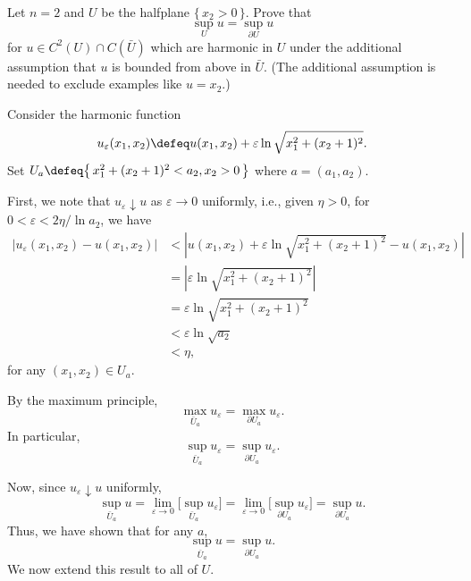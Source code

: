 \begin{problem}
  Let \(n=2\) and \(U\) be the halfplane \(\{\,x_2>0\,\}\). Prove that
  \[
    \sup_U u=\sup_{\partial U}u
  \]
  for \(u\in C^2(U)\cap C(\bar U)\) which are harmonic in \(U\) under the
  additional assumption that \(u\) is bounded from above in \(\bar
  U\). (The additional assumption is needed to exclude examples like
  \(u=x_2\).)

\end{problem}
\begin{solution}
  Consider the harmonic function
  \[
    u_\varepsilon(x_1,x_2)\defeq
    u(x_1,x_2)+\varepsilon\ln\sqrt{x_1^2+(x_2+1)^2}.
  \]
  Set \(U_a\defeq \bigl\{\,x_1^2+(x_2+1)^2<a_2,x_2>0\,\bigr\}\) where
  \(a=(a_1,a_2)\).

  First, we note that \(u_\varepsilon\downarrow u\) as \(\varepsilon\to 0\)
  uniformly, i.e., given \(\eta>0\), for \(0<\varepsilon<2\eta/{\ln a_2}\),
  we have
  \begin{align*}
    |u_\varepsilon(x_1,x_2)-u(x_1,x_2)|
    &<\left|
      u(x_1,x_2)+\varepsilon\ln\sqrt{x_1^2+(x_2+1)^2}
      -u(x_1,x_2)
      \right|\\
    &=\left|
      \varepsilon\ln\sqrt{x_1^2+(x_2+1)^2}
      \right|\\
    &=\varepsilon\ln\sqrt{x_1^2+(x_2+1)^2}\\
    &<\varepsilon\ln\sqrt{a_2}\\
    &<\eta,
  \end{align*}
  for any \((x_1,x_2)\in U_a\).

  By the maximum principle,
  \[
    \max_{\bar U_a}u_\varepsilon=\max_{\partial U_a}u_\varepsilon.
  \]
  In particular,
  \[
    \sup_{\bar U_a}u_\varepsilon=\sup_{\partial U_a}u_\varepsilon.
  \]

  Now, since \(u_\varepsilon\downarrow u\) uniformly,
  \[
    \sup_{\bar U_a}u=%
    \lim_{\varepsilon\to 0}\biggl[\sup_{\bar U_a}u_\varepsilon\biggr]=%
    \lim_{\varepsilon\to 0}\biggl[\sup_{\partial U_a}u_\varepsilon\biggr]=%
    \sup_{\partial U_a}u.
  \]
  Thus, we have shown that for any \(a\),
  \begin{equation}
    \label{eq:5:sup-ua}
    \sup_{\bar U_a}u=\sup_{\partial U_a}u.
  \end{equation}
  We now extend this result to all of \(U\).
\end{solution}
\newpage

